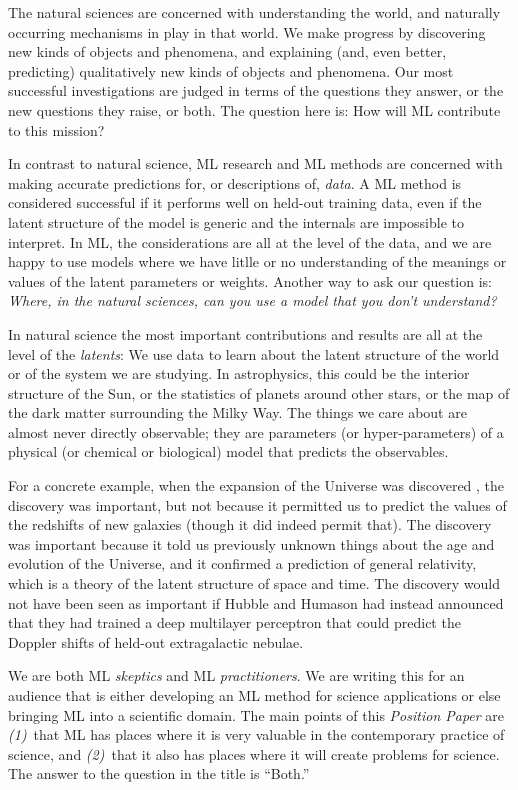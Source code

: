 \documentclass[10pt]{article}
\newcommand{\documentname}{\textsl{Position Paper}}
\begin{document}
The natural sciences are concerned with understanding the world, and naturally occurring mechanisms in play in that world.
We make progress by discovering new kinds of objects and phenomena, and explaining (and, even better, predicting) qualitatively new kinds of objects and phenomena.
Our most successful investigations are judged in terms of the questions they answer, or the new questions they raise, or both.
The question here is: How will ML contribute to this mission?

In contrast to natural science, ML research and ML methods are concerned with making accurate predictions for, or descriptions of, \emph{data}.
A ML method is considered successful if it performs well on held-out training data, even if the latent structure of the model is generic and the internals are impossible to interpret.
In ML, the considerations are all at the level of the data, and we are happy to use models where we have litlle or no understanding of the meanings or values of the latent parameters or weights.
Another way to ask our question is:
\emph{Where, in the natural sciences, can you use a model that you don't understand?}

In natural science the most important contributions and results are all at the level of the \emph{latents}:
We use data to learn about the latent structure of the world or of the system we are studying.
In astrophysics, this could be the interior structure of the Sun, or the statistics of planets around other stars, or the map of the dark matter surrounding the Milky Way.
The things we care about are almost never directly observable; they are parameters (or hyper-parameters) of a physical (or chemical or biological) model that predicts the observables.

For a concrete example, when the expansion of the Universe was discovered \cite{expansion, expansion2}, the discovery was important, but not because it permitted us to predict the values of the redshifts of new galaxies (though it did indeed permit that).
The discovery was important because it told us previously unknown things about the age and evolution of the Universe, and it confirmed a prediction of general relativity, which is a theory of the latent structure of space and time.
The discovery would not have been seen as important if Hubble and Humason had instead announced that they had trained a deep multilayer perceptron that could predict the Doppler shifts of held-out extragalactic nebulae.

We are both ML \emph{skeptics} and ML \emph{practitioners}.
We are writing this for an audience that is either developing an ML method for science applications or else bringing ML into a scientific domain.
The main points of this \documentname{} are \textsl{(1)}~that ML has places where it is very valuable in the contemporary practice of science, and \textsl{(2)}~that it also has places where it will create problems for science.
The answer to the question in the title is ``Both.''
\end{document}
